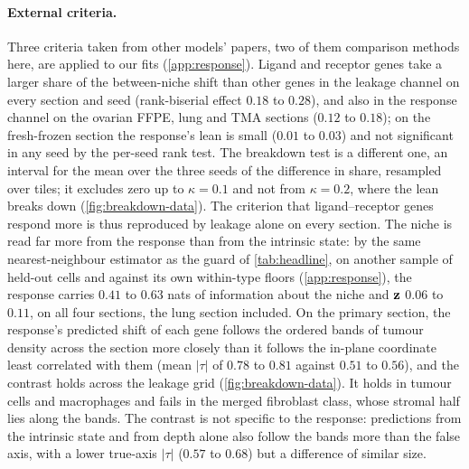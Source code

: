 \paragraph{External criteria.}
 Three criteria taken from other models' papers, two of them comparison methods here, are applied to our fits (\cref{app:response}). Ligand and receptor genes take a larger share of the between-niche shift than other genes in the leakage channel on every section and seed (rank-biserial effect $0.18$ to $0.28$), and also in the response channel on the ovarian FFPE, lung and TMA sections ($0.12$ to $0.18$); on the fresh-frozen section the response's lean is small ($0.01$ to $0.03$) and not significant in any seed by the per-seed rank test. The breakdown test is a different one, an interval for the mean over the three seeds of the difference in share, resampled over tiles; it excludes zero up to $\kappa = 0.1$ and not from $\kappa = 0.2$, where the lean breaks down (\cref{fig:breakdown-data}). The criterion that ligand--receptor genes respond more is thus reproduced by leakage alone on every section. The niche is read far more from the response than from the intrinsic state: by the same nearest-neighbour estimator as the guard of \cref{tab:headline}, on another sample of held-out cells and against its own within-type floors (\cref{app:response}), the response carries $0.41$ to $0.63$ nats of information about the niche and $\mathbf{z}$ $0.06$ to $0.11$, on all four sections, the lung section included. On the primary section, the response's predicted shift of each gene follows the ordered bands of tumour density across the section more closely than it follows the in-plane coordinate least correlated with them (mean $|\tau|$ of $0.78$ to $0.81$ against $0.51$ to $0.56$), and the contrast holds across the leakage grid (\cref{fig:breakdown-data}). It holds in tumour cells and macrophages and fails in the merged fibroblast class, whose stromal half lies along the bands. The contrast is not specific to the response: predictions from the intrinsic state and from depth alone also follow the bands more than the false axis, with a lower true-axis $|\tau|$ ($0.57$ to $0.68$) but a difference of similar size.

